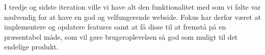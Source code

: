 I tredje og sidste iteration ville vi have alt den funktionalitet med som vi følte var nødvendig for at have en god og velfungerende webside. Fokus har derfor været at implementere og opdatere features samt at få disse til at fremstå på en præsentabel måde, som vil gøre brugeroplevelsen så god som muligt til det endelige produkt.














